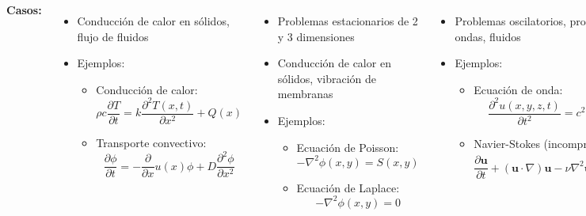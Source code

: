 \documentclass[9pt, aspectratio=169]{beamer}
\begin{document}
\begin{frame}
\begin{columns}[t]
\cx
\textbf{Casos:}
 {
    \begin{itemize}
        \item Conducción de calor en sólidos, flujo de fluidos
        \item Ejemplos:
            \begin{itemize}
                \item Conducción de calor:
                    \[ \rho c \frac{\partial T}{\partial t} = k \frac{\partial^2 T(x, t)}{\partial x^2} + Q(x) \]
                \item Transporte convectivo:
                    \[ \frac{\partial \phi}{\partial t} = -\frac{\partial}{\partial x} u(x) \phi + D \frac{\partial^2 \phi}{\partial x^2} \]
            \end{itemize}
    \end{itemize}
}
 {
    \begin{itemize}
        \item Problemas estacionarios de 2 y 3 dimensiones
        \item Conducción de calor en sólidos, vibración de membranas
        \item Ejemplos:
            \begin{itemize}
                \item Ecuación de Poisson:
                    \[ -\nabla^2 \phi(x, y) = S(x, y) \]
                \item Ecuación de Laplace:
                    \[ -\nabla^2 \phi(x, y) = 0 \]
            \end{itemize}
    \end{itemize}
}
 {
    \begin{itemize}
        \item Problemas oscilatorios, propagación de ondas, fluidos
        \item Ejemplos:
        \begin{itemize}
            \item Ecuación de onda:
                \[ \frac{\partial^2 u(x, y, z, t)}{\partial t^2} = c^2 \nabla^2 u(x, y, z, t) \]
            \item Navier-Stokes (incompresible):
                \[ \frac{\partial \bm{u}}{\partial t} + (\bm{u} \cdot \nabla) \bm{u} - \nu \nabla^2 \bm{u} = -\nabla \left( \frac{p}{p_0} \right) + \bm{g} \] 
        \end{itemize}
    \end{itemize}
}
\end{columns}
\end{frame}
\end{document}
